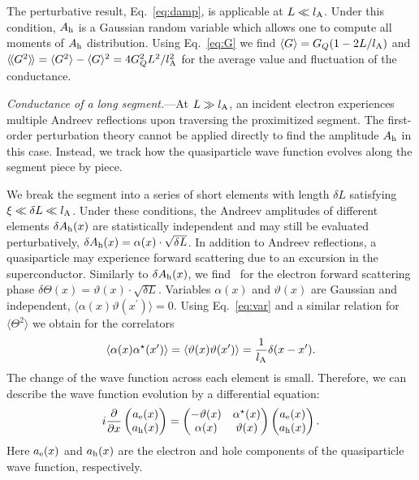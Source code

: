 \documentclass[reprint,
superscriptaddress,
amsmath,
amssymb,
aps,
prl,
floatfix,
english
]{revtex4-2}
\newcommand{\lprox}{L}
\newcommand{\lA}{l_{\rm A}}
\newcommand{\he}{A_{\rm h}}
\newcommand{\xic}{\xi}
\newcommand{\rngl}{\rangle\hspace{-0.05cm}\rangle}
\newcommand{\lngl}{\langle\hspace{-0.05cm}\langle}
\begin{document}
The perturbative result, Eq.~\eqref{eq:damp}, is applicable at $\lprox \ll \lA$. Under this condition, $A_{\rm h}$ is a Gaussian random variable which allows one to compute all moments of $A_{\rm h}$ distribution. 
Using Eq.~\eqref{eq:G} we find $\langle G \rangle = G_Q ( 1 - 2 L / l_{\rm A})$ and $\lngl G^2 \rngl = \langle G^2\rangle - \langle G\rangle^2 =4G^2_Q L^2 / \lA^2$ for the average value and fluctuation of the conductance.

\textit{Conductance of a long segment.}---At $\lprox \gg \lA$,
an incident electron experiences multiple Andreev reflections upon traversing the proximitized segment. The first-order perturbation theory cannot be applied directly to find the amplitude $A_{\rm h}$ in this case.
Instead, we track how the quasiparticle wave function evolves along the segment piece by piece.

We break the segment into a series of short elements with length $\delta L$ satisfying $\xic \ll \delta L \ll \lA$. Under these conditions, the Andreev amplitudes of different elements $\delta \he (x)$ are statistically independent and may still be evaluated perturbatively,
$\delta \he(x) = \alpha(x) \cdot \sqrt{\delta L}$. In addition to Andreev reflections, a quasiparticle may experience forward scattering due to an excursion in the superconductor. 
Similarly to $\delta \he (x)$, we find~\cite{sm} for the electron forward scattering phase $\delta \Theta (x) = \vartheta(x)\cdot \sqrt{\delta L}$. Variables $\alpha(x)$ and $\vartheta(x)$ are Gaussian and independent, $\langle \alpha(x) \vartheta (x^\prime)\rangle = 0$. Using Eq.~\eqref{eq:var} and a similar relation for $\langle \Theta^2 \rangle$ we obtain for the correlators
\begin{equation}\label{eq:corrs}
    \langle \alpha(x) \alpha^\star (x^\prime) \rangle = \langle \vartheta (x) \vartheta (x^\prime) \rangle = \frac{1}{\lA} \delta (x - x^\prime).
\end{equation}
The change of the wave function across each element is small. Therefore, we can describe the wave function evolution by a differential equation:
\begin{equation}\label{eq:evol}
    i \frac{\partial}{\partial x} \begin{pmatrix}
    a_{\rm e}(x)\\a_{\rm h}(x)
    \end{pmatrix} = 
    \begin{pmatrix}
    -\vartheta(x) & \alpha^\star(x)\\
    \alpha(x) & \vartheta(x)
    \end{pmatrix}
    \begin{pmatrix}
    a_{\rm e}(x)\\a_{\rm h}(x)
    \end{pmatrix}.
\end{equation}
Here $a_{\rm e}(x)$ and $a_{\rm h}(x)$ are the electron and hole components of the quasiparticle wave function, respectively. 
\end{document}
